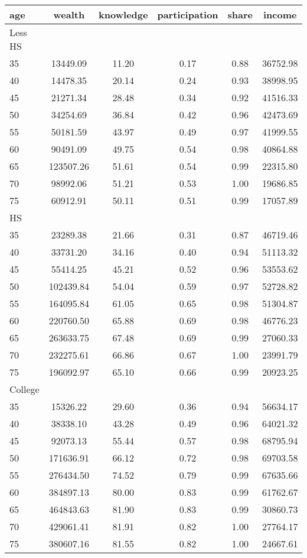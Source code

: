  \begin{tabular}{lccccc}
 \hline \hline
  age & wealth & knowledge & participation & share & income \\
 \hline
 Less HS & & & & & \\
 \hline
35 &  13449.09 &     11.20 &      0.17 &      0.88 &  36752.98 \\ 
40 &  14478.35 &     20.14 &      0.24 &      0.93 &  38998.95 \\ 
45 &  21271.34 &     28.48 &      0.34 &      0.92 &  41516.33 \\ 
50 &  34254.69 &     36.84 &      0.42 &      0.96 &  42473.69 \\ 
55 &  50181.59 &     43.97 &      0.49 &      0.97 &  41999.55 \\ 
60 &  90491.09 &     49.75 &      0.54 &      0.98 &  40864.88 \\ 
65 & 123507.26 &     51.61 &      0.54 &      0.99 &  22315.80 \\ 
70 &  98992.06 &     51.21 &      0.53 &      1.00 &  19686.85 \\ 
75 &  60912.91 &     50.11 &      0.51 &      0.99 &  17057.89 \\ 
 \hline
 HS & & & & & \\
 \hline
35 &  23289.38 &     21.66 &      0.31 &      0.87 &  46719.46 \\ 
40 &  33731.20 &     34.16 &      0.40 &      0.94 &  51113.32 \\ 
45 &  55414.25 &     45.21 &      0.52 &      0.96 &  53553.62 \\ 
50 & 102439.84 &     54.04 &      0.59 &      0.97 &  52728.82 \\ 
55 & 164095.84 &     61.05 &      0.65 &      0.98 &  51304.87 \\ 
60 & 220760.50 &     65.88 &      0.69 &      0.98 &  46776.23 \\ 
65 & 263633.75 &     67.48 &      0.69 &      0.99 &  27060.33 \\ 
70 & 232275.61 &     66.86 &      0.67 &      1.00 &  23991.79 \\ 
75 & 196092.97 &     65.10 &      0.66 &      0.99 &  20923.25 \\ 
 \hline
 College & & & & & \\
 \hline
35 &  15326.22 &     29.60 &      0.36 &      0.94 &  56634.17 \\ 
40 &  38338.10 &     43.28 &      0.49 &      0.96 &  64021.32 \\ 
45 &  92073.13 &     55.44 &      0.57 &      0.98 &  68795.94 \\ 
50 & 171636.91 &     66.12 &      0.72 &      0.98 &  69703.58 \\ 
55 & 276434.50 &     74.52 &      0.79 &      0.99 &  67635.66 \\ 
60 & 384897.13 &     80.00 &      0.83 &      0.99 &  61762.67 \\ 
65 & 464843.63 &     81.90 &      0.83 &      0.99 &  30860.73 \\ 
70 & 429061.41 &     81.91 &      0.82 &      1.00 &  27764.17 \\ 
75 & 380607.16 &     81.55 &      0.82 &      1.00 &  24667.61 \\ 
 \hline \hline
 \end{tabular}
